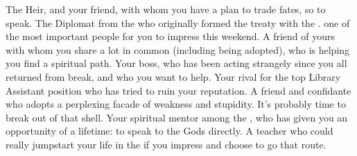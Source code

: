 \documentclass[char]{GL2020}
\begin{document}
\begin{contacts}
    \contact{\cHeir{}} The \cHeir{\formal} Heir, and your friend, with whom you have a plan to trade fates, so to speak.
    \contact{\cDiplomat{}} The Diplomat from the \pTech{} who originally formed the treaty with the \pFarm{}. \cDiplomat{\Theyare} one of the most important people for you to impress this weekend.
    \contact{\cScholarship{}} A friend of yours with whom you share a lot in common (including being adopted), who is helping you find a spiritual path.
    \contact {\cLibrarian{}} Your boss, who has been acting strangely since you all returned from break, and who you want to help.
    \contact{\cLibAssist{}} Your rival for the top Library Assistant position who has tried to ruin your reputation.
    \contact{\cChupStudent{}} A friend and confidante who adopts a perplexing facade of weakness and stupidity. It's probably time to break \cChupStudent{\them} out of that shell.
    \contact{\cFlowPriest{}} Your spiritual mentor among the \pShippies{}, who has given you an opportunity of a lifetime: to speak to the Gods directly.
    \contact{\cPrince{}} A \pFarm{} teacher who could really jumpstart your life in the \pFarm{} if you impress \cPrince{\them} and choose to go that route.
\end{contacts}
\end{document}
